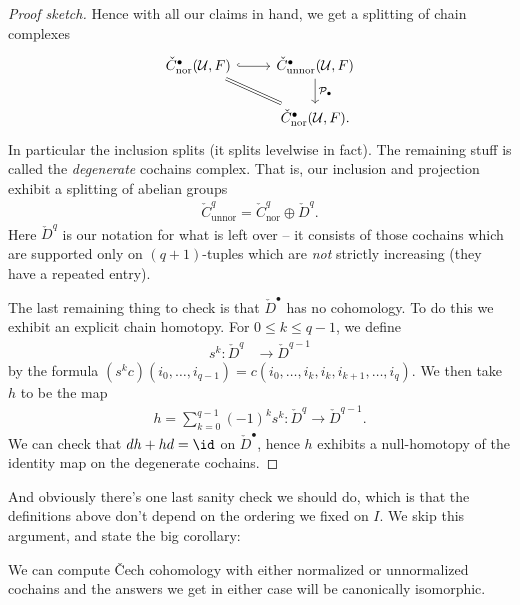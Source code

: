 \documentclass[11pt]{amsart}
\begin{document}
\begin{proof}[Proof sketch]
Hence with all our claims in hand, we get a splitting of chain complexes
\[ \begin{tikzcd}
    {\check{C}^\bullet_\text{nor}(\mathcal{U},F)}\rar[hook]\ar[dr,equal] & {\check{C}^\bullet_\text{unnor}(\mathcal{U},F)}\dar["\mathcal{P}_\bullet" right]\\
     & {\check{C}^\bullet_\text{nor}(\mathcal{U},F)}.
\end{tikzcd} \]
In particular the inclusion splits (it splits levelwise in fact). The remaining stuff is called the \emph{degenerate} cochains complex. That is, our inclusion and projection exhibit a splitting of abelian groups
\begin{align*}
    \check{C}^q_\text{unnor} = \check{C}^q_\text{nor} \oplus \check{D}^q.
\end{align*}
Here $\check{D}^q$ is our notation for what is left over -- it consists of those cochains which are supported only on $(q+1)$-tuples which are \emph{not} strictly increasing (they have a repeated entry).

The last remaining thing to check is that $\check{D}^\bullet$ has no cohomology. To do this we exhibit an explicit chain homotopy. For $0\le k\le q-1$, we define
\begin{align*}
    s^k \colon \check{D}^q &\to \check{D}^{q-1}
\end{align*}
by the formula $(s^k c)(i_0, \ldots, i_{q-1}) = c(i_0, \ldots, i_k,i_k,i_{k+1}, \ldots, i_q)$. We then take $h$ to be the map
\begin{align*}
    h = \sum_{k=0}^{q-1} (-1)^k s^k \colon \check{D}^q \to \check{D}^{q-1}.
\end{align*}
We can check that $dh + hd = \id$ on $\check{D}^\bullet$, hence $h$ exhibits a null-homotopy of the identity map on the degenerate cochains.
\end{proof}

And obviously there's one last sanity check we should do, which is that the definitions above don't depend on the ordering we fixed on $I$. We skip this argument, and state the big corollary:

\begin{corollary}\label{cor:normalized-unnormalized-doesnt-matter} We can compute \v{C}ech cohomology with either normalized or unnormalized cochains and the answers we get in either case will be canonically isomorphic.
\end{corollary}
\end{document}
